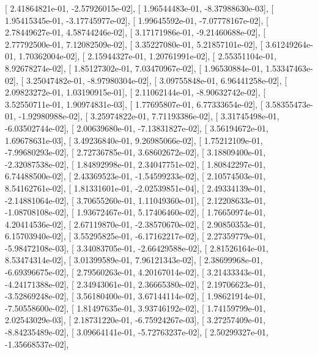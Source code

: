 \documentclass{article}
\begin{document}
       [  2.41864821e-01,  -2.57926015e-02],
       [  1.96544483e-01,  -8.37988630e-03],
       [  1.95415345e-01,  -3.17745977e-02],
       [  1.99645592e-01,  -7.07778167e-02],
       [  2.78449627e-01,   4.58744246e-02],
       [  3.17171986e-01,  -9.21460688e-02],
       [  2.77792500e-01,   7.12082509e-02],
       [  3.35227080e-01,   5.21857101e-02],
       [  3.61249264e-01,   1.70362004e-02],
       [  2.15944327e-01,   1.20761991e-02],
       [  2.55351104e-01,   8.92678274e-02],
       [  1.85127302e-01,   7.03470967e-02],
       [  1.96530884e-01,   1.53347463e-02],
       [  3.25047482e-01,  -8.97980304e-02],
       [  3.09755848e-01,   6.96441258e-02],
       [  2.09823272e-01,   1.03190915e-01],
       [  2.11062144e-01,  -8.90632742e-02],
       [  3.52550711e-01,   1.90974831e-03],
       [  1.77695807e-01,   6.77333654e-02],
       [  3.58355473e-01,  -1.92980988e-02],
       [  3.25974822e-01,   7.71193386e-02],
       [  3.31745498e-01,  -6.03502744e-02],
       [  2.00639680e-01,  -7.13831827e-02],
       [  3.56194672e-01,   1.69678631e-03],
       [  3.49236840e-01,   9.26985066e-02],
       [  1.75212109e-01,  -7.99680293e-02],
       [  2.72736785e-01,   3.68602672e-02],
       [  3.18809400e-01,  -2.32087538e-02],
       [  1.84892998e-01,   2.34047751e-02],
       [  1.80842297e-01,   6.74488500e-02],
       [  2.43369523e-01,  -1.54599233e-02],
       [  2.10574503e-01,   8.54162761e-02],
       [  1.81331601e-01,  -2.02539851e-04],
       [  2.49334139e-01,  -2.14881064e-02],
       [  3.70655260e-01,   1.11049360e-01],
       [  2.12208633e-01,  -1.08708108e-02],
       [  1.93672467e-01,   5.17406460e-02],
       [  1.76650974e-01,   4.20414536e-02],
       [  2.67119870e-01,  -2.38570670e-02],
       [  2.90850353e-01,   6.15703940e-02],
       [  3.55295825e-01,  -6.17162217e-02],
       [  2.27359779e-01,  -5.98472108e-03],
       [  3.34083705e-01,  -2.66429588e-02],
       [  2.81526164e-01,   8.53474314e-02],
       [  3.01399589e-01,   7.96121343e-02],
       [  2.38699968e-01,  -6.69396675e-02],
       [  2.79560263e-01,   4.20167014e-02],
       [  3.21433343e-01,  -4.24171388e-02],
       [  2.34943061e-01,   2.36665380e-02],
       [  2.19706623e-01,  -3.52869248e-02],
       [  3.56180400e-01,   3.67144114e-02],
       [  1.98621914e-01,  -7.50558600e-02],
       [  1.81497635e-01,   3.93746192e-02],
       [  1.74159799e-01,   2.02543029e-03],
       [  2.18731220e-01,  -6.75924267e-03],
       [  3.27257409e-01,  -8.84235489e-02],
       [  3.09664141e-01,  -5.72763237e-02],
       [  2.50299327e-01,  -1.35668537e-02],
\end{document}
